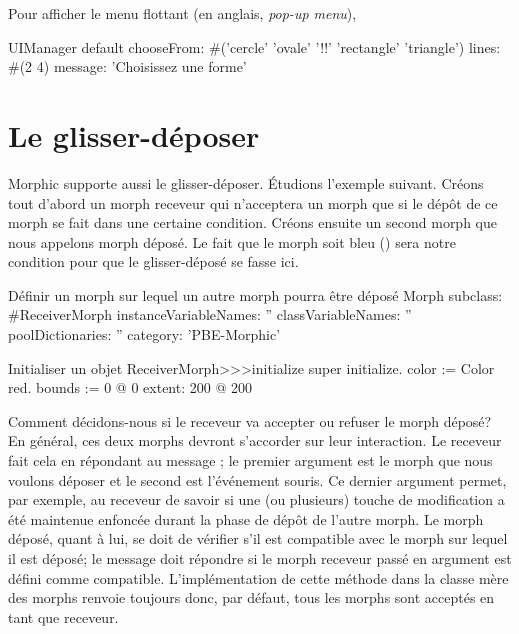 \documentclass[a4paper,10pt,twoside]{book}
\begin{document}
Pour afficher le menu flottant (en anglais, \emph{pop-up menu}), 
\begin{code}{}
UIManager default
	chooseFrom: #('cercle' 'ovale' '!!' 'rectangle' 'triangle')
	lines: #(2 4) message: 'Choisissez une forme'
\end{code}

\section{Le glisser-déposer}

Morphic supporte aussi le glisser-déposer. Étudions l'exemple
suivant. Créons tout d'abord un morph receveur qui n'acceptera un
morph que si le dépôt de ce morph se fait dans une certaine
condition. Créons ensuite un second morph que nous appelons morph
déposé. Le fait que le morph soit bleu () sera
notre condition pour que le glisser-déposé se fasse ici.

\begin{classdef}{Définir un morph sur lequel un autre morph pourra être déposé}
Morph subclass: #ReceiverMorph
	instanceVariableNames: ''
	classVariableNames: ''
	poolDictionaries: ''
	category: 'PBE-Morphic'
\end{classdef}

\begin{method}{Initialiser un objet }
ReceiverMorph>>>initialize
	super initialize.
	color := Color red.
	bounds := 0 @ 0 extent: 200 @ 200
\end{method}

Comment décidons-nous si le receveur va accepter ou refuser le morph
déposé? En général, ces deux morphs devront s'accorder sur
leur interaction. Le receveur fait cela en répondant au message
 ; le premier argument est le
 morph que nous voulons déposer et le second est l'événement
 souris. Ce dernier argument permet, par exemple, au receveur de
 savoir si une (ou plusieurs) touche de modification a été
 maintenue enfoncée durant la phase de dépôt de l'autre morph.
Le morph déposé, quant à lui, se doit de vérifier s'il est
compatible avec le morph sur lequel il est déposé; le message
 doit répondre  si le morph
receveur 
passé en argument est défini comme compatible. L'implémentation
de cette méthode dans la classe mère des morphs  renvoie
toujours  donc, par défaut, tous les morphs sont acceptés en tant que
receveur.
\end{document}
